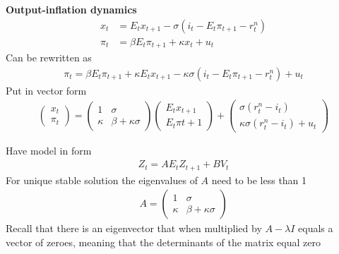 \documentclass{beamer}
\begin{document}
\begin{frame}
  \textbf{Output-inflation dynamics}
\begin{align}
  x_t &=E_tx_{t+1} - \sigma(i_t-E_t\pi_{t+1} - r_t^n)\\
  \pi_t &= \beta E_t \pi_{t+1} + \kappa x_t + u_t
\end{align}
  Can be rewritten as 
\begin{align}
  \pi_t = \beta E_t \pi_{t+1} + \kappa E_t x_{t+1} - \kappa\sigma(i_t - E_t \pi_{t+1} - r_t^n) + u_t
\end{align}
 Put in vector form
\begin{align}
  \begin{pmatrix} x_t \\ \pi_t \end{pmatrix} = \begin{pmatrix} 1 & \sigma \\ \kappa & \beta +\kappa\sigma \end{pmatrix}
  \begin{pmatrix} E_tx_{t+1} \\ E_t \pi{t+1} \end{pmatrix} + 
  \begin{pmatrix} \sigma (r_t^n-i_t) \\ \kappa\sigma (r_t^n-i_t) + u_t \end{pmatrix}
\end{align}  
\end{frame}

\begin{frame}
 Have model in form
 \begin{align}
  Z_t=AE_tZ_{t+1}+BV_t 
 \end{align}
 For unique stable solution the eigenvalues of $A$ need to be less than 1
\begin{align} 
 A=\begin{pmatrix} 1 & \sigma \\ \kappa & \beta +\kappa\sigma \end{pmatrix} 
 \end{align}
 Recall that there is an eigenvector that when multiplied by $A-\lambda I$ equals a vector of zeroes, meaning that the determinants of the matrix equal zero
\end{frame}
\end{document}
